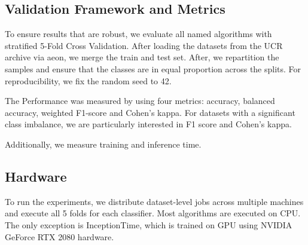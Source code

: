 \subsection{Validation Framework and Metrics}
To ensure results that are robust, we evaluate all named algorithms with stratified 5-Fold Cross Validation. After loading the datasets from the UCR archive via aeon, we merge the train and test set. After, we repartition the samples and ensure that the classes are in equal proportion across the splits. For reproducibility, we fix the random seed to 42. 

The Performance was measured by using four metrics: accuracy, balanced accuracy, weighted F1-score and Cohen’s kappa. For datasets with a significant class imbalance, we are particularly interested in F1 score and Cohen's kappa. 

Additionally, we measure training and inference time. 

\subsection{Hardware}
To run the experiments, we distribute dataset-level jobs across multiple machines and execute all 5 folds for each classifier. Most algorithms are executed on CPU. The only exception is InceptionTime, which is trained on GPU using NVIDIA GeForce RTX 2080 hardware.
